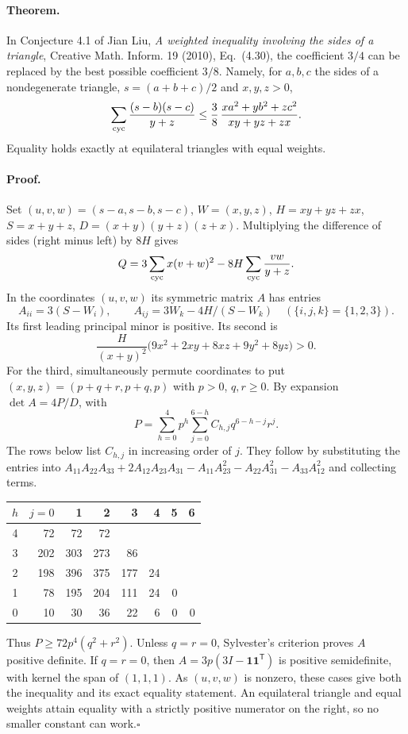 \documentclass[11pt,a4paper]{article}
\numberwithin{equation}{section}
\theoremstyle{definition}
\theoremstyle{remark}
\begin{document}
\paragraph{Theorem.} In Conjecture 4.1 of Jian Liu, \textit{A weighted inequality involving the sides of a triangle}, Creative Math. Inform. 19 (2010), Eq.~(4.30), the coefficient $3/4$ can be replaced by the best possible coefficient $3/8$. Namely, for $a,b,c$ the sides of a nondegenerate triangle, $s=(a+b+c)/2$ and $x,y,z>0$,
\[
 \sum_{\rm cyc}\frac{(s-b)(s-c)}{y+z}
 \le\frac38\,\frac{xa^2+yb^2+zc^2}{xy+yz+zx}.
\]
Equality holds exactly at equilateral triangles with equal weights.

\paragraph{Proof.} Set $(u,v,w)=(s-a,s-b,s-c)$, $W=(x,y,z)$, $H=xy+yz+zx$, $S=x+y+z$, $D=(x+y)(y+z)(z+x)$. Multiplying the difference of sides (right minus left) by $8H$ gives
\[
 Q=3\sum_{\rm cyc}x(v+w)^2-8H\sum_{\rm cyc}\frac{vw}{y+z}.
\]
In the coordinates $(u,v,w)$ its symmetric matrix $A$ has entries
\[
 A_{ii}=3(S-W_i),\qquad
 A_{ij}=3W_k-4H/(S-W_k)\quad(\{i,j,k\}=\{1,2,3\}).
\]
Its first leading principal minor is positive. Its second is
\[
 \frac{H}{(x+y)^2}\big(9x^2+2xy+8xz+9y^2+8yz\big)>0.
\]
For the third, simultaneously permute coordinates to put $(x,y,z)=(p+q+r,p+q,p)$ with $p>0$, $q,r\ge0$. By expansion $\det A=4P/D$, with
\[
 P=\sum_{h=0}^4p^h\sum_{j=0}^{6-h} C_{h,j} q^{6-h-j}r^j.
\]
The rows below list $C_{h,j}$ in increasing order of $j$. They follow by substituting the entries into $A_{11}A_{22}A_{33}+2A_{12}A_{23}A_{31}-A_{11}A_{23}^2-A_{22}A_{31}^2-A_{33}A_{12}^2$ and collecting terms.
\begin{center}\begin{tabular}{c|rrrrrrr}
$h$ &$j=0$&1&2&3&4&5&6\\\hline
4&72&72&72\\3&202&303&273&86\\2&198&396&375&177&24\\
1&78&195&204&111&24&0\\0&10&30&36&22&6&0&0
\end{tabular}\end{center}
Thus $P\ge72p^4(q^2+r^2)$. Unless $q=r=0$, Sylvester's criterion proves $A$ positive definite. If $q=r=0$, then $A=3p(3I-\mathbf1\mathbf1^{\mathsf T})$ is positive semidefinite, with kernel the span of $(1,1,1)$. As $(u,v,w)$ is nonzero, these cases give both the inequality and its exact equality statement. An equilateral triangle and equal weights attain equality with a strictly positive numerator on the right, so no smaller constant can work.\hfill$\square$
\end{document}
